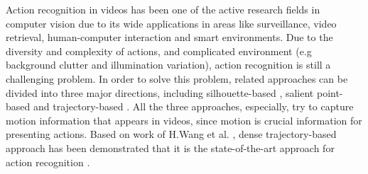 \documentclass[final,3p,times,twocolumn]{elsarticle}
\begin{document}
Action recognition in videos has been one of the active research fields in computer vision \cite{pirsiavash2012detecting, poppe2010survey} due to its wide applications in areas like surveillance, video retrieval, human-computer interaction and smart environments.
Due to the diversity and complexity of actions, and complicated environment (e.g background clutter and illumination variation), action recognition is still a challenging problem.
In order to solve this problem, related approaches can be divided into three major directions, including silhouette-based \cite{blank2005actions, ke2007event, vitaladevuni2008action, yilmaz2005actions}, salient point-based \cite{laptev2005space, dollar2005behavior, laptev2008learning, bregonzio2009recognising, klaser2008aspatiotemporal, willems2008efficient} and trajectory-based \cite{matikainen2009trajectons, messing2009activity, sun2009hierarchical}.
All the three approaches, especially, try to capture motion information that appears in videos, since motion is crucial information for presenting actions.
Based on work of H.Wang et al. \cite{wang2011densetraj}, dense trajectory-based approach has been demonstrated that it is the state-of-the-art approach for action recognition \cite{phan2014multimedia, oneata2012axes, natarajan2012bbn}.
\end{document}
